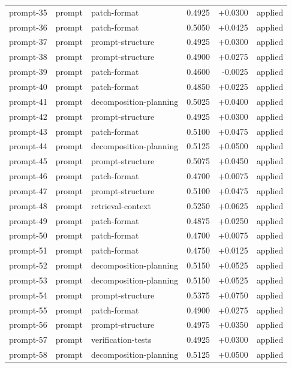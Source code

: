 \begin{center}
\begin{longtable}{llp{5.2cm}rrl}
prompt-35 & prompt & patch-format & 0.4925 & +0.0300 & applied \\
prompt-36 & prompt & patch-format & 0.5050 & +0.0425 & applied \\
prompt-37 & prompt & prompt-structure & 0.4925 & +0.0300 & applied \\
prompt-38 & prompt & prompt-structure & 0.4900 & +0.0275 & applied \\
prompt-39 & prompt & patch-format & 0.4600 & -0.0025 & applied \\
prompt-40 & prompt & patch-format & 0.4850 & +0.0225 & applied \\
prompt-41 & prompt & decomposition-planning & 0.5025 & +0.0400 & applied \\
prompt-42 & prompt & prompt-structure & 0.4925 & +0.0300 & applied \\
prompt-43 & prompt & patch-format & 0.5100 & +0.0475 & applied \\
prompt-44 & prompt & decomposition-planning & 0.5125 & +0.0500 & applied \\
prompt-45 & prompt & prompt-structure & 0.5075 & +0.0450 & applied \\
prompt-46 & prompt & patch-format & 0.4700 & +0.0075 & applied \\
prompt-47 & prompt & prompt-structure & 0.5100 & +0.0475 & applied \\
prompt-48 & prompt & retrieval-context & 0.5250 & +0.0625 & applied \\
prompt-49 & prompt & patch-format & 0.4875 & +0.0250 & applied \\
prompt-50 & prompt & patch-format & 0.4700 & +0.0075 & applied \\
prompt-51 & prompt & patch-format & 0.4750 & +0.0125 & applied \\
prompt-52 & prompt & decomposition-planning & 0.5150 & +0.0525 & applied \\
prompt-53 & prompt & decomposition-planning & 0.5150 & +0.0525 & applied \\
prompt-54 & prompt & prompt-structure & 0.5375 & +0.0750 & applied \\
prompt-55 & prompt & patch-format & 0.4900 & +0.0275 & applied \\
prompt-56 & prompt & prompt-structure & 0.4975 & +0.0350 & applied \\
prompt-57 & prompt & verification-tests & 0.4925 & +0.0300 & applied \\
prompt-58 & prompt & decomposition-planning & 0.5125 & +0.0500 & applied \\

\end{longtable}
\end{center}
